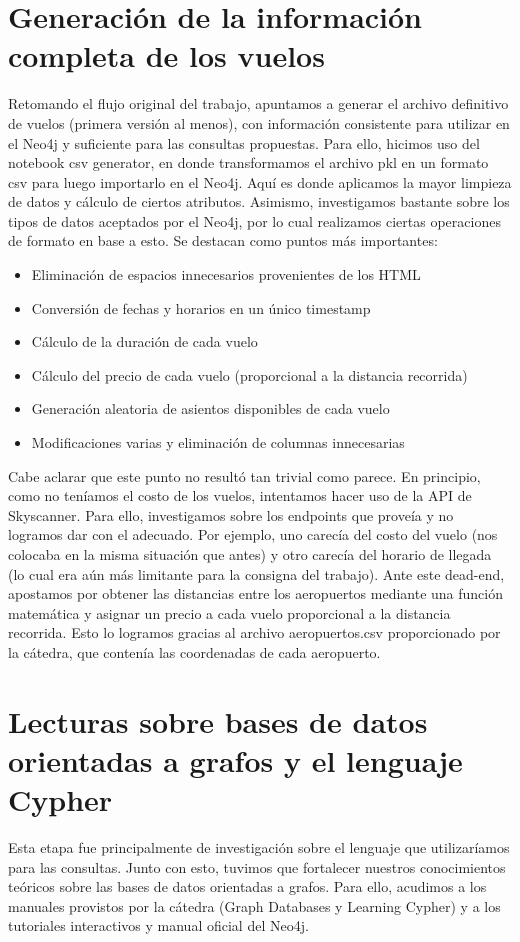 \documentclass[a4paper,11pt]{article}
\begin{document}
\section{Generación de la información completa de los vuelos}
Retomando el flujo original del trabajo, apuntamos a generar el archivo definitivo de vuelos (primera versión al menos), con información consistente para utilizar en el Neo4j y suficiente para las consultas propuestas.
Para ello, hicimos uso del notebook csv generator, en donde transformamos el archivo pkl en un formato csv para luego importarlo en el Neo4j.
Aquí es donde aplicamos la mayor limpieza de datos y cálculo de ciertos atributos. Asimismo, investigamos bastante sobre los tipos de datos aceptados por el Neo4j, por lo cual realizamos ciertas operaciones de formato en base a esto. Se destacan como puntos más importantes:
\begin{itemize}
\item Eliminación de espacios innecesarios provenientes de los HTML
\item Conversión de fechas y horarios en un único timestamp
\item Cálculo de la duración de cada vuelo
\item Cálculo del precio de cada vuelo (proporcional a la distancia recorrida)
\item Generación aleatoria de asientos disponibles de cada vuelo
\item Modificaciones varias y eliminación de columnas innecesarias
\end{itemize}
Cabe aclarar que este punto no resultó tan trivial como parece.
En principio, como no teníamos el costo de los vuelos, intentamos hacer uso de la API de Skyscanner. Para ello, investigamos sobre los endpoints que proveía y no logramos dar con el adecuado. Por ejemplo, uno carecía del costo del vuelo (nos colocaba en la misma situación que antes) y otro carecía del horario de llegada (lo cual era aún más limitante para la consigna del trabajo).
Ante este dead-end, apostamos por obtener las distancias entre los aeropuertos mediante una función matemática y asignar un precio a cada vuelo proporcional a la distancia recorrida. Esto lo logramos gracias al archivo aeropuertos.csv proporcionado por la cátedra, que contenía las coordenadas de cada aeropuerto.

\section{Lecturas sobre bases de datos orientadas a grafos y el lenguaje Cypher}
Esta etapa fue principalmente de investigación sobre el lenguaje que utilizaríamos para las consultas. Junto con esto, tuvimos que fortalecer nuestros conocimientos teóricos sobre las bases de datos orientadas a grafos.
Para ello, acudimos a los manuales provistos por la cátedra (Graph Databases y Learning Cypher) y a los tutoriales interactivos y manual oficial del Neo4j.
\end{document}
